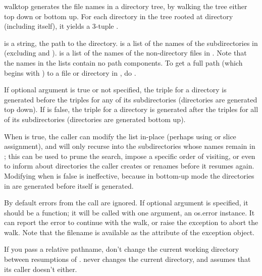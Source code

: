 \begin{funcdesc}{walk}{top}
 generates the file names in a directory tree, by
walking the tree either top down or bottom up.
For each directory in the tree rooted at directory  (including
 itself), it yields a 3-tuple
.

 is a string, the path to the directory.   is
a list of the names of the subdirectories in 
(excluding  and ).   is a list of
the names of the non-directory files in .  Note that the
names in the lists contain no path components.  To get a full
path (which begins with ) to a file or directory in
, do .

If optional argument  is true or not specified, the triple
for a directory is generated before the triples for any of its
subdirectories (directories are generated top down).  If  is
false, the triple for a directory is generated after the triples for all
of its subdirectories (directories are generated bottom up).

When  is true, the caller can modify the  list
in-place (perhaps using  or slice assignment), and
 will only recurse into the subdirectories whose names
remain in ; this can be used to prune the search,
impose a specific order of visiting, or even to inform 
about directories the caller creates or renames before it resumes
 again.  Modifying  when  is
false is ineffective, because in bottom-up mode the directories in
 are generated before  itself is generated.

By default errors from the  call are ignored.  If
optional argument  is specified, it should be a function;
it will be called with one argument, an os.error instance.  It can
report the error to continue with the walk, or raise the exception
to abort the walk.  Note that the filename is available as the
 attribute of the exception object.

\begin{notice}
If you pass a relative pathname, don't change the current working
directory between resumptions of .  
never changes the current directory, and assumes that its caller
doesn't either.
\end{notice}


\end{funcdesc}

